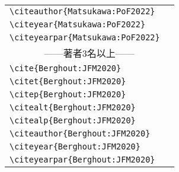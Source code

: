 \documentclass[a4paper,fleqn,12pt,uplatex]{jsarticle}
\begin{document}
\begin{table}[t]
\begin{tabular}{ll}
        \verb|\citeauthor{Matsukawa:PoF2022}|   &\citeauthor{Matsukawa:PoF2022} \\
        \verb|\citeyear{Matsukawa:PoF2022}|     &\citeyear{Matsukawa:PoF2022} \\
        \verb|\citeyearpar{Matsukawa:PoF2022}|  &\citeyearpar{Matsukawa:PoF2022} \\
        \multicolumn{2}{c}{------著者3名以上------} \\
        \verb|\cite{Berghout:JFM2020}|          &\cite{Berghout:JFM2020} \\
        \verb|\citet{Berghout:JFM2020}|         &\citet{Berghout:JFM2020} \\
        \verb|\citep{Berghout:JFM2020}|         &\citep{Berghout:JFM2020} \\
        \verb|\citealt{Berghout:JFM2020}|       &\citealt{Berghout:JFM2020} \\
        \verb|\citealp{Berghout:JFM2020}|       &\citealp{Berghout:JFM2020} \\
        \verb|\citeauthor{Berghout:JFM2020}|    &\citeauthor{Berghout:JFM2020} \\
        \verb|\citeyear{Berghout:JFM2020}|      &\citeyear{Berghout:JFM2020} \\
        \verb|\citeyearpar{Berghout:JFM2020}|   &\citeyearpar{Berghout:JFM2020}
    \end{tabular}
\end{table}
\end{document}
